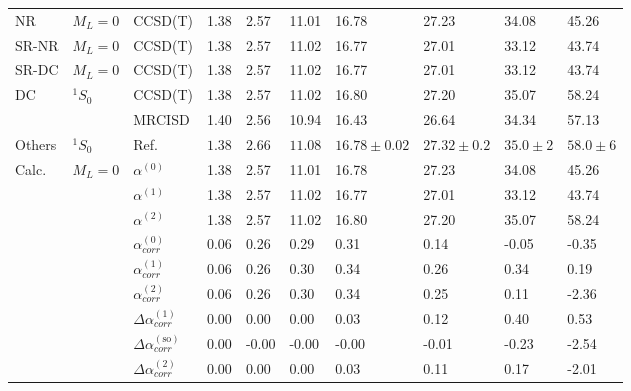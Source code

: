 \begin{longtable}{llllllllll}
\bottomrule
\endlastfoot
NR & $M_L=0$ & CCSD(T) &    1.38 &    2.57 &    11.01 &           16.78 &          27.23 &       34.08 &       45.26 \\
SR-NR & $M_L=0$ & CCSD(T) &    1.38 &    2.57 &    11.02 &           16.77 &          27.01 &       33.12 &       43.74 \\
SR-DC & $M_L=0$ & CCSD(T) &    1.38 &    2.57 &    11.02 &           16.77 &          27.01 &       33.12 &       43.74 \\
DC & $^1S_0$ & CCSD(T) &    1.38 &    2.57 &    11.02 &           16.80 &          27.20 &       35.07 &       58.24 \\
      &         & MRCISD &    1.40 &    2.56 &    10.94 &           16.43 &          26.64 &       34.34 &       57.13 \\
Others & $^1S_0$ & Ref. \cite{Schwerdtfeger2019} &  $1.38$ &  $2.66$ &  $11.08$ &  $16.78\pm0.02$ &  $27.32\pm0.2$ &  $35.0\pm2$ &  $58.0\pm6$ \\
Calc. & $M_L=0$ & $\alpha^{(0)}$ &    1.38 &    2.57 &    11.01 &           16.78 &          27.23 &       34.08 &       45.26 \\
      &         & $\alpha^{(1)}$ &    1.38 &    2.57 &    11.02 &           16.77 &          27.01 &       33.12 &       43.74 \\
      &         & $\alpha^{(2)}$ &    1.38 &    2.57 &    11.02 &           16.80 &          27.20 &       35.07 &       58.24 \\
      &         & $\alpha_{corr}^{(0)}$ &    0.06 &    0.26 &     0.29 &            0.31 &           0.14 &       -0.05 &       -0.35 \\
      &         & $\alpha_{corr}^{(1)}$ &    0.06 &    0.26 &     0.30 &            0.34 &           0.26 &        0.34 &        0.19 \\
      &         & $\alpha_{corr}^{(2)}$ &    0.06 &    0.26 &     0.30 &            0.34 &           0.25 &        0.11 &       -2.36 \\
      &         & $\Delta \alpha_{corr}^{(\text{1})}$ &    0.00 &    0.00 &     0.00 &            0.03 &           0.12 &        0.40 &        0.53 \\
      &         & $\Delta \alpha_{corr}^{(\text{so})}$ &    0.00 &   -0.00 &    -0.00 &           -0.00 &          -0.01 &       -0.23 &       -2.54 \\
      &         & $\Delta \alpha_{corr}^{(\text{2})}$ &    0.00 &    0.00 &     0.00 &            0.03 &           0.11 &        0.17 &       -2.01 \\

\end{longtable}
